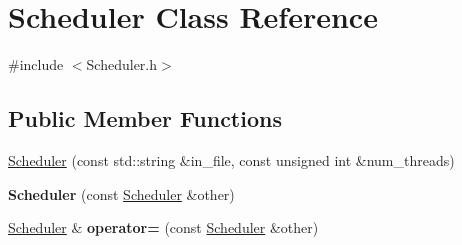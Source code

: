 \hypertarget{classScheduler}{\section{Scheduler Class Reference}
\label{classScheduler}
}


{\ttfamily \#include $<$Scheduler.\-h$>$}

\subsection*{Public Member Functions}
\begin{DoxyCompactItemize}
\item 
\hyperlink{classScheduler_a9d9fdac53788885928fa849892250819}{Scheduler} (const std\-::string \&in\-\_\-file, const unsigned int \&num\-\_\-threads)
\item 
\hypertarget{classScheduler_aa55196b20c6a062b2f479776738622fd}{{\bfseries Scheduler} (const \hyperlink{classScheduler}{Scheduler} \&other)}\label{classScheduler_aa55196b20c6a062b2f479776738622fd}

\item 
\hypertarget{classScheduler_a8a41677eaa1266ec0ab41dcf0ac0d865}{\hyperlink{classScheduler}{Scheduler} \& {\bfseries operator=} (const \hyperlink{classScheduler}{Scheduler} \&other)}\label{classScheduler_a8a41677eaa1266ec0ab41dcf0ac0d865}


\end{DoxyCompactItemize}
